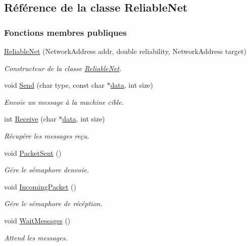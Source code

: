 \hypertarget{class_reliable_net}{}\subsection{Référence de la classe Reliable\+Net}
\label{class_reliable_net}
\subsubsection*{Fonctions membres publiques}
\begin{DoxyCompactItemize}
\item 
\hyperlink{class_reliable_net_ab4a1b19edd7bb7f0704c8dafc1aa7bd5}{Reliable\+Net} (Network\+Address addr, double reliability, Network\+Address target)
\begin{DoxyCompactList}\small\item\em Constructeur de la classe \hyperlink{class_reliable_net}{Reliable\+Net}. \end{DoxyCompactList}\item 
void \hyperlink{class_reliable_net_a75900761b71ea519bc750abd10a2608c}{Send} (char type, const char $\ast$\hyperlink{structdata}{data}, int size)
\begin{DoxyCompactList}\small\item\em Envoie un message à la machine cible. \end{DoxyCompactList}\item 
int \hyperlink{class_reliable_net_abb821a7c0ec13b9d7faef0801051ba48}{Receive} (char $\ast$\hyperlink{structdata}{data}, int size)
\begin{DoxyCompactList}\small\item\em Récupére les messages reçu. \end{DoxyCompactList}\item 
\hypertarget{class_reliable_net_a0cc97509f1aed0a461e9758c3a8b64ea}{}\label{class_reliable_net_a0cc97509f1aed0a461e9758c3a8b64ea} 
void \hyperlink{class_reliable_net_a0cc97509f1aed0a461e9758c3a8b64ea}{Packet\+Sent} ()
\begin{DoxyCompactList}\small\item\em Gére le sémaphore d\textquotesingle{}envoie. \end{DoxyCompactList}\item 
\hypertarget{class_reliable_net_a6f69ebd945dd0f879eef0b1ab63a17f6}{}\label{class_reliable_net_a6f69ebd945dd0f879eef0b1ab63a17f6} 
void \hyperlink{class_reliable_net_a6f69ebd945dd0f879eef0b1ab63a17f6}{Incoming\+Packet} ()
\begin{DoxyCompactList}\small\item\em Gére le sémaphore de récéption. \end{DoxyCompactList}\item 
\hypertarget{class_reliable_net_a68ad4f4faf8b5f96163434752e2f7b19}{}\label{class_reliable_net_a68ad4f4faf8b5f96163434752e2f7b19} 
void \hyperlink{class_reliable_net_a68ad4f4faf8b5f96163434752e2f7b19}{Wait\+Messages} ()
\begin{DoxyCompactList}\small\item\em Attend les messages. \end{DoxyCompactList}\end{DoxyCompactItemize}
